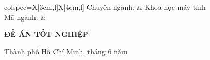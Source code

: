 \begin{titlepage}
\begin{center}
    \begin{tblr}{colspec={X[3cm,l]X[4cm,l]}}
        {\td\fontsize{13pt}{15pt}\selectfont Chuyên ngành:} & {\td\fontsize{13pt}{15pt}\selectfont Khoa học máy tính}\\
        {\td\fontsize{13pt}{15pt}\selectfont Mã ngành:} & {\td\fontsize{13pt}{15pt}}
    \end{tblr}
\end{center}

\vspace{1cm}

\begin{center}
    {\td\bfseries\fontsize{20pt}{24pt}\selectfont ĐỀ ÁN TỐT NGHIỆP}\\[0.1cm]
\end{center}


\vspace{0.3cm}

\vfill
\begin{center}
{\td\fontsize{13pt}{15pt}\selectfont Thành phố Hồ Chí Minh, tháng 6 năm \number\year}
\end{center}
\end{titlepage}
